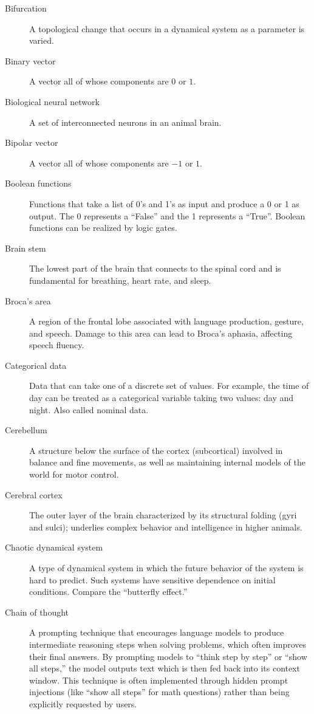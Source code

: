 \begin{description}
\item[Bifurcation] A topological change that occurs in a dynamical system as a parameter is varied.

\item[Binary vector] A vector all of whose components are $0$ or $1$.

\item[Biological neural network] A set of interconnected neurons in an animal brain.

\item[Bipolar vector] A vector all of whose components are $-1$ or $1$.

\item[Boolean functions] Functions that take a list of 0's and 1's as input and produce a 0 or 1 as output. The 0 represents a ``False'' and the 1 represents a ``True''. Boolean functions can be realized by logic gates.

\item[Brain stem] The lowest part of the brain that connects to the spinal cord and is fundamental for breathing, heart rate, and sleep.

\item[Broca's area] A region of the frontal lobe associated with language production, gesture, and speech. Damage to this area can lead to Broca's aphasia, affecting speech fluency.

\item[Categorical data] Data that can take one of a discrete set of values. For example, the time of day can be treated as a categorical variable taking two values: day and night. Also called nominal data.

\item[Cerebellum] A structure below the surface of the cortex (subcortical) involved in balance and fine movements, as well as maintaining internal models of the world for motor control.

\item[Cerebral cortex] The outer layer of the brain characterized by its structural folding (gyri and sulci); underlies complex behavior and intelligence in higher animals. 

\item[Chaotic dynamical system] A type of dynamical system in which the future behavior of the system is hard to predict. Such systems have sensitive dependence on initial conditions. Compare the ``butterfly effect.''

\item[Chain of thought] A prompting technique that encourages language models to produce intermediate reasoning steps when solving problems, which often improves their final answers. By prompting models to ``think step by step'' or ``show all steps,'' the model outputs text which is then fed back into its context window. This technique is often implemented through hidden prompt injections (like ``show all steps'' for math questions) rather than being explicitly requested by users.


\end{description}
